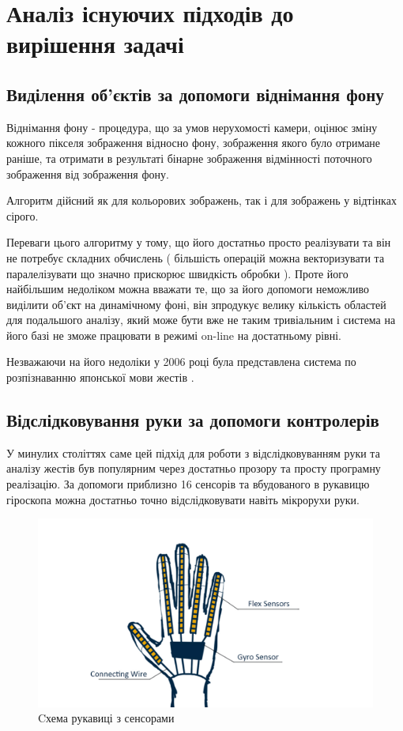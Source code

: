 \section{Аналіз існуючих підходів до вирішення задачі}
\jointitles
\subsection{Виділення об'єктів за допомоги віднімання фону}
Віднімання фону - процедура, що за умов нерухомості камери, оцінює зміну кожного пікселя зображення відносно фону, зображення якого було отримане раніше, та отримати в результаті бінарне зображення відмінності поточного зображення від зображення фону.

Алгоритм дійсний як для кольорових зображень, так і для зображень у відтінках сірого.

Переваги цього алгоритму у тому, що його достатньо просто реалізувати та він не потребує складних обчислень ( більшість операцій можна векторизувати та паралелізувати що значно прискорює швидкість обробки ). Проте його найбільшим недоліком можна вважати те, що за його допомоги неможливо виділити об'єкт на динамічному фоні, він зпродукує велику кількість областей для подальшого аналізу, який може бути вже не таким тривіальним і система на його базі не зможе працювати в режимі on-line на достатньому рівні.

Незважаючи на його недоліки у 2006 році була представлена система по розпізнаванню японської мови жестів \cite{BackgroundSubtraction}.

\subsection{Відслідковування руки за допомоги контролерів}

У минулих століттях саме цей підхід для роботи з відслідковуванням руки та аналізу жестів був популярним через достатньо прозору та просту програмну реалізацію. За допомоги приблизно 16 сенсорів та вбудованого в рукавицю гіроскопа можна достатньо точно відслідковувати навіть мікрорухи руки.

\begin{figure}[H]
	\includegraphics[width=0.9\linewidth]{task_analysis/img/wired_glove}
	\caption{Cхема рукавиці з сенсорами}
\end{figure}

